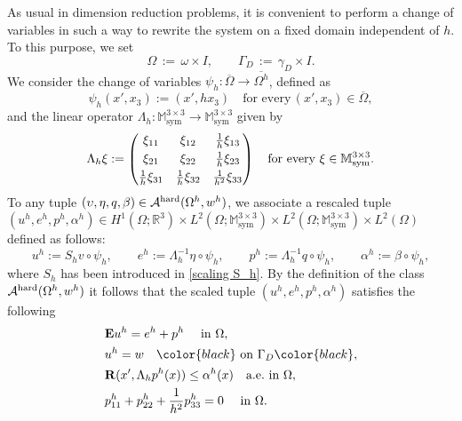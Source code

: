 \documentclass[reqno,10pt]{amsart}
\numberwithin{equation}{section}
\theoremstyle{remark}
\newcommand{\BLACK}{\color{black}}
\newcommand{\PINK}{\color{black}}
\newcommand{\calA}{\mathcal{A}}
\newcommand{\M}{\mathbb{M}}
\newcommand{\R}{\mathbb{R}}
\DeclareMathOperator{\sym}{sym}
\newcommand{\closure}[1]{\overline{#1}}
\newcommand{\Dir}{D}
\newcommand{\scaling}{{S}}
\newcommand{\E}{{\bf E}}
\newcommand{\disspot}{\mathbf{R}}
\begin{document}
As usual in dimension reduction problems, it is convenient to perform a change of variables in such a way to rewrite the system on a fixed domain independent of $h$.
To this purpose, we set
\begin{equation*}
	\Omega \,:=\, \omega \times I, \qquad 
	\Gamma_\Dir \,:=\, \gamma_\Dir \times I.
\end{equation*}
We consider the change of variables $\psi_h : \closure{\Omega} \to \closure{\Omega^h}$, defined as
\begin{equation} \label{eq:def-psih}
	\psi_h(x',x_3) := (x', hx_3) \quad \text{for every}\, (x',x_3) \in \closure{\Omega},
\end{equation}
and the linear operator $\Lambda_h : \M_{\sym}^{3 \times 3} \to \M_{\sym}^{3 \times 3}$ given by 
\begin{equation} \label{definition Lambda_h}
	\Lambda_h \xi:=\begin{pmatrix}
	\xi_{11} & \xi_{12} & \frac{1}{h}\xi_{13}
	\vspace{0.1 cm}\\
	\xi_{21} & \xi_{22} & \frac{1}{h}\xi_{23}
	\vspace{0.1 cm}\\
	\frac{1}{h}\xi_{31} & \frac{1}{h}\xi_{32} & \frac{1}{h^2}\xi_{33}
	\end{pmatrix}
	\quad\text{for every }\xi \in \M^{3 \times 3}_{\sym}.
\end{equation}
To any tuple $(\upsilon, \eta, q, \beta) \in \calA^{\rm hard}(\Omega^h, w^h)$, we associate a rescaled tuple $(u^h, e^h, p^h, \alpha^h) \in H^1(\Omega;\R^3) \times L^2(\Omega;\M^{3 \times 3}_{\sym}) \times L^2(\Omega;\M^{3 \times 3}_{\sym}) \times L^2(\Omega)$ defined as follows:
\begin{equation*}
	u^h := \scaling_h v \circ \psi_h, \qquad
	e^h := \Lambda_{h}^{-1}\eta \circ \psi_h, \qquad
	p^h := \Lambda_{h}^{-1}q \circ \psi_h, \qquad 
	\alpha^h := \beta \circ \psi_h,
\end{equation*}
{\PINK where $\scaling_h$ has been introduced in \eqref{scaling S_h}.\BLACK}
By the definition of the class $\calA^{\rm hard}(\Omega^h, w^h)$ it follows that the scaled tuple $(u^h, e^h, p^h, \alpha^h)$ satisfies the following
\begin{eqnarray}
	& {\E}u^h = e^h + p^h \quad \text{ in } \Omega, \label{straindec*}\\
	& u^h = w \quad {\PINK\text{ on } \Gamma_\Dir\BLACK}, \label{boundcondp*}\\
	& \disspot(x', \Lambda_h p^h(x)) \leq \alpha^h(x) \quad \text{a.e.} \text{ in } \Omega,\\
	& p^h_{11} + p^h_{22} + \frac{1}{h^2}p^h_{33} = 0 \quad \text{ in } \Omega. \label{trace*}
\end{eqnarray}
\end{document}
